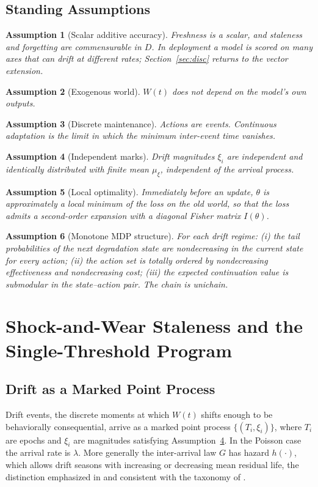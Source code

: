 \documentclass[journal]{IEEEtran}
\newtheorem{assumption}{Assumption}
\begin{document}
\subsection{Standing Assumptions}
\begin{assumption}[Scalar additive accuracy]\label{as:scalar}
Freshness is a scalar, and staleness and forgetting are commensurable in $D$. In deployment a model is scored on many axes that can drift at different rates; Section~\ref{sec:disc} returns to the vector extension.
\end{assumption}
\begin{assumption}[Exogenous world]\label{as:exo}
$W(t)$ does not depend on the model's own outputs.
\end{assumption}
\begin{assumption}[Discrete maintenance]\label{as:disc}
Actions are events. Continuous adaptation is the limit in which the minimum inter-event time vanishes.
\end{assumption}
\begin{assumption}[Independent marks]\label{as:marks}
Drift magnitudes $\xi_i$ are independent and identically distributed with finite mean $\mu_\xi$, independent of the arrival process.
\end{assumption}
\begin{assumption}[Local optimality]\label{as:local}
Immediately before an update, $\theta$ is approximately a local minimum of the loss on the old world, so that the loss admits a second-order expansion with a diagonal Fisher matrix $I(\theta)$.
\end{assumption}
\begin{assumption}[Monotone MDP structure]\label{as:monotone}
For each drift regime: (i) the tail probabilities of the next degradation state are nondecreasing in the current state for every action; (ii) the action set is totally ordered by nondecreasing effectiveness and nondecreasing cost; (iii) the expected continuation value is submodular in the state--action pair. The chain is unichain.
\end{assumption}

\section{Shock-and-Wear Staleness and the Single-Threshold Program}\label{sec:shock}
\subsection{Drift as a Marked Point Process}
Drift events, the discrete moments at which $W(t)$ shifts enough to be behaviorally consequential, arrive as a marked point process $\{(T_i,\xi_i)\}$, where $T_i$ are epochs and $\xi_i$ are magnitudes satisfying Assumption~\ref{as:marks}. In the Poisson case the arrival rate is $\lambda$. More generally the inter-arrival law $G$ has hazard $h(\cdot)$, which allows drift seasons with increasing or decreasing mean residual life, the distinction emphasized in \cite{beytur2025} and consistent with the taxonomy of \cite{lu2019}.
\end{document}
